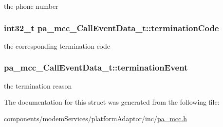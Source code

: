 the phone number 

\subsubsection[{\texorpdfstring{termination\+Code}{terminationCode}}]{\setlength{\rightskip}{0pt plus 5cm}int32\+\_\+t pa\+\_\+mcc\+\_\+\+Call\+Event\+Data\+\_\+t\+::termination\+Code}\hypertarget{structpa__mcc___call_event_data__t_a0cac0a4b1a80aacb3e56f9d6730be7b5}{}\label{structpa__mcc___call_event_data__t_a0cac0a4b1a80aacb3e56f9d6730be7b5}


the corresponding termination code 

\subsubsection[{\texorpdfstring{termination\+Event}{terminationEvent}}]{ pa\+\_\+mcc\+\_\+\+Call\+Event\+Data\+\_\+t\+::termination\+Event}\hypertarget{structpa__mcc___call_event_data__t_a759fc09739f7091988eb9951a0f8d1aa}{}\label{structpa__mcc___call_event_data__t_a759fc09739f7091988eb9951a0f8d1aa}


the termination reason 



The documentation for this struct was generated from the following file\+:\begin{DoxyCompactItemize}
\item 
components/modem\+Services/platform\+Adaptor/inc/\hyperlink{pa__mcc_8h}{pa\+\_\+mcc.\+h}\end{DoxyCompactItemize}
